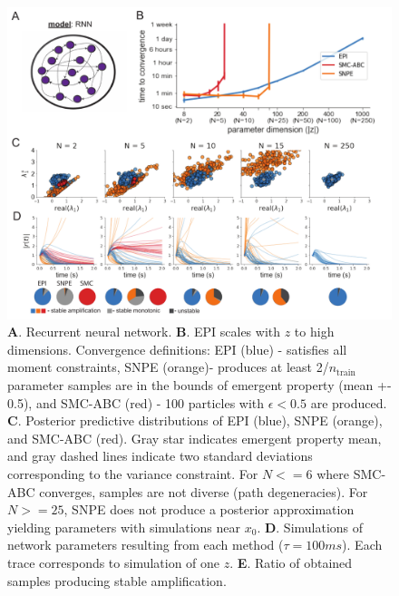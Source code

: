 \documentclass[11pt]{article}
\begin{document}
\begin{figure}
\begin{center}
\includegraphics[scale=.8]{figures/fig4/fig4.pdf}
\end{center}
\caption{\small 
\textbf{A}. Recurrent neural network.
\textbf{B}. EPI scales with $z$ to high dimensions. 
Convergence definitions: 
EPI (blue) - satisfies all moment constraints, 
SNPE (orange)- produces at least 2/$n_{\text{train}}$ parameter samples are in the bounds of emergent property (mean +- 0.5), 
and SMC-ABC (red) - 100 particles with $\epsilon < 0.5$ are produced.
\textbf{C}. Posterior predictive distributions of EPI (blue), SNPE (orange), and SMC-ABC (red). 
Gray star indicates emergent property mean, and gray dashed lines indicate two standard deviations corresponding to the variance constraint.
For $N <= 6$ where SMC-ABC converges, samples are not diverse (path degeneracies).  
For $N >= 25$, SNPE does not produce a posterior approximation yielding parameters with simulations near $x_0$. 
\textbf{D}. Simulations of network parameters resulting from each method ($\tau=100ms$).  Each trace corresponds to simulation of one $z$.  
\textbf{E}. Ratio of obtained samples producing stable amplification.
}
\label{fig:LRRNN}
\end{figure}
\end{document}
